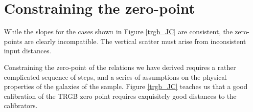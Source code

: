 \documentclass[11pt,preprint2]{aastex}
\begin{document}




\section{Constraining the zero-point}
\label{absolute}
While the slopes for the cases shown in Figure \ref{trgb_JC} are consistent, the zero-points are clearly incompatible. The vertical scatter must arise from inconsistent input distances.

Constraining the zero-point of the relations we have derived requires a rather complicated sequence of steps, and a series of assumptions on the physical properties of the galaxies of the sample. Figure \ref{trgb_JC} teaches us that a good calibration of the TRGB zero point requires exquisitely good distances to the calibrators.
\end{document}
